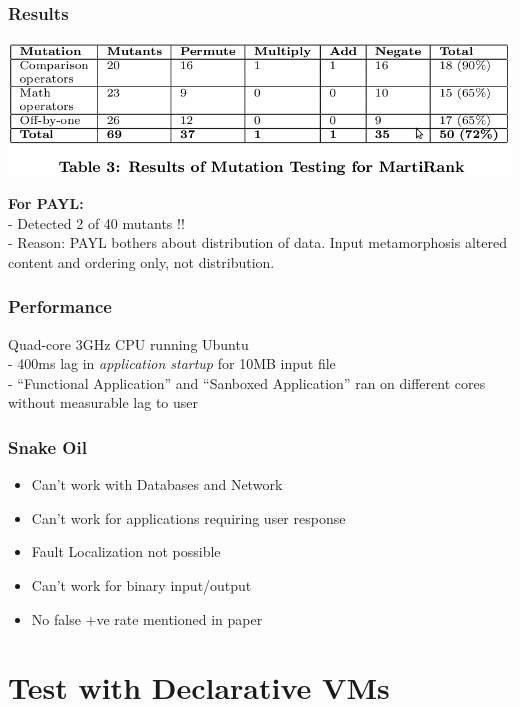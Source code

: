 \documentclass[compress,red]{beamer}
\begin{document}
\frame
{
	\frametitle{Results}
	\begin{center}
	\includegraphics[scale=0.3]{amst-table2.png}
	\end{center}

	\textbf{For PAYL:} \\
	 - Detected 2 of 40 mutants !! \\
	 - Reason: PAYL bothers about distribution of data. Input metamorphosis altered content and ordering only, not distribution. 
}

\frame
{
	\frametitle{Performance}
	Quad-core 3GHz CPU running Ubuntu \\
	- 400ms lag in \textit{application startup} for 10MB input file \\  
	- ``Functional Application'' and ``Sanboxed Application'' ran on different cores without measurable lag to user

}

\frame
{
	\frametitle{Snake Oil}
	\begin{itemize}
		\item Can't work with Databases and Network 
		\item Can't work for applications requiring user response 
		\item Fault Localization not possible
		\item Can't work for binary input/output 
		\item No false +ve rate mentioned in paper
	\end{itemize}
}

\section{Test with Declarative VMs}
\end{document}
